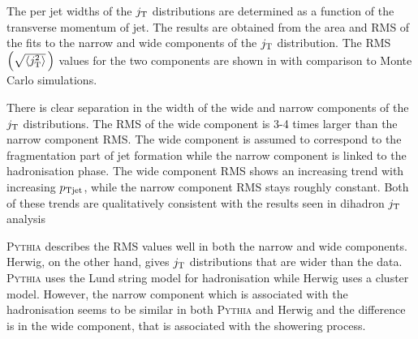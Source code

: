 
The per jet  widths of the $j_{\rm T}$ distributions are determined as a function of the transverse momentum of jet. The results are obtained from the area and RMS of the fits to the narrow and wide components of the $j_{\rm T}$ distribution. The RMS $\left(\sqrt{\left<j_{\rm T}^2\right>}\,\right)$ values for the two components are shown in  with comparison to Monte Carlo simulations.

There is clear separation in the width of the wide and narrow components of the $j_{\rm T}$ distributions. The RMS of the wide component is 3-4 times larger than the narrow component RMS. The wide component is assumed to correspond to the fragmentation part of jet formation while the narrow component is linked to the hadronisation phase. The wide component RMS shows an increasing trend with increasing $p_{\rm Tjet}$, while the narrow component RMS stays roughly constant. Both of these trends are qualitatively consistent with the results seen in dihadron $j_{\rm T}$ analysis~\cite{ALICEjt}

\textsc{Pythia} describes the RMS values well in both the narrow and wide components. Herwig, on the other hand, gives $j_{\rm T}$ distributions that are wider than the data. \textsc{Pythia} uses the Lund string model for hadronisation while Herwig uses a cluster model. However, the narrow component which is associated with the hadronisation seems to be similar in both \textsc{Pythia} and Herwig and the difference is in the wide component, that is associated with the showering process.

